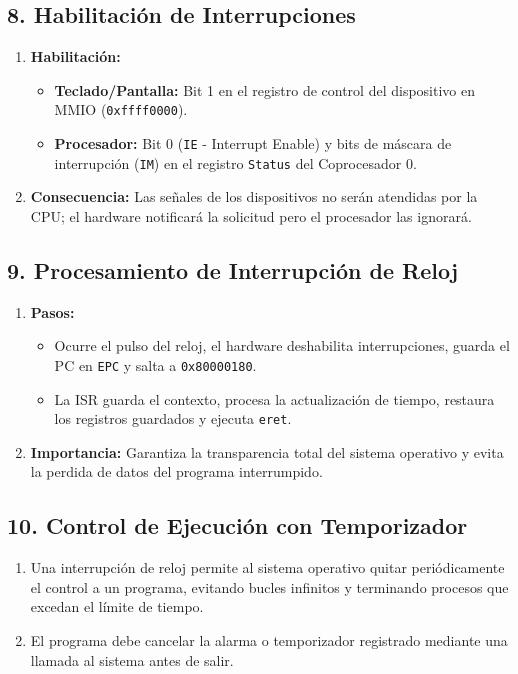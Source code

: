 \documentclass[12pt,a4paper]{article}
\begin{document}
\subsection*{8. Habilitación de Interrupciones}
\begin{enumerate}
    \item[a)] \textbf{Habilitación:}
    \begin{itemize}
        \item \textbf{Teclado/Pantalla:} Bit 1 en el registro de control del dispositivo en MMIO (\texttt{0xffff0000}).
        \item \textbf{Procesador:} Bit 0 (\texttt{IE} - Interrupt Enable) y bits de máscara de interrupción (\texttt{IM}) en el registro \texttt{Status} del Coprocesador 0.
    \end{itemize}
    \item[b)] \textbf{Consecuencia:} Las señales de los dispositivos no serán atendidas por la CPU; el hardware notificará la solicitud pero el procesador las ignorará.
\end{enumerate}

\subsection*{9. Procesamiento de Interrupción de Reloj}
\begin{enumerate}
    \item[a)] \textbf{Pasos:}
    \begin{itemize}
        \item Ocurre el pulso del reloj, el hardware deshabilita interrupciones, guarda el PC en \texttt{EPC} y salta a \texttt{0x80000180}.
        \item La ISR guarda el contexto, procesa la actualización de tiempo, restaura los registros guardados y ejecuta \texttt{eret}.
    \end{itemize}
    \item[b)] \textbf{Importancia:} Garantiza la transparencia total del sistema operativo y evita la perdida de datos del programa interrumpido.
\end{enumerate}

\subsection*{10. Control de Ejecución con Temporizador}
\begin{enumerate}
    \item[a)] Una interrupción de reloj permite al sistema operativo quitar periódicamente el control a un programa, evitando bucles infinitos y terminando procesos que excedan el límite de tiempo.
    \item[b)] El programa debe cancelar la alarma o temporizador registrado mediante una llamada al sistema antes de salir.
\end{enumerate}
\end{document}
